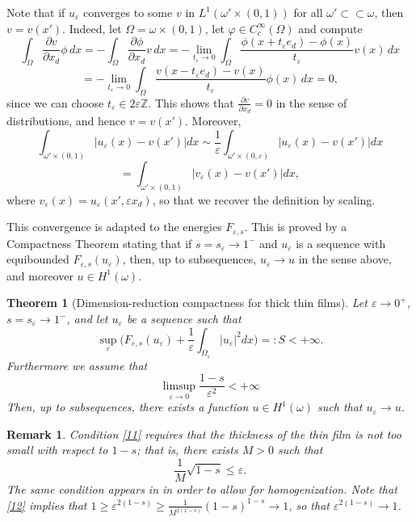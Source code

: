 \documentclass{article}
\newtheorem{remark}[lemma]{Remark}
\newtheorem{theorem}[lemma]{Theorem}
\newcommand{\e}{\varepsilon}
\begin{document}
Note that if $u_\e$ converges to some $v$ in $L^1(\omega'\times (0,1))$  for all $\omega'\subset\!\subset\omega$, then $v=v(x')$. Indeed, let $\Omega=\omega\times (0,1)$, let $\varphi\in C^\infty_c(\Omega)$ and compute 
$$
\int_\Omega \frac{\partial v}{\partial x_d}\phi \,dx= -\int_\Omega \frac{\partial \phi}{\partial x_d}v \,dx=
-\lim_{t_\e\to 0}\int_\Omega \frac{\phi(x+t_\e e_d)-\phi(x)}{t_\e}v(x) \,dx
$$
$$=
-\lim_{t_\e\to 0}\int_\Omega \frac{v(x-t_\e e_d)-v(x)}{t_\e}\phi(x) \,dx=0,
$$
since we can choose $t_\e\in2\e\mathbb Z$. This shows that $\frac{\partial v}{\partial x_d}=0$ in the sense of distributions, and hence $v=v(x')$. Moreover,
$$
\int_{\omega'\times (0,1)} |u_\e(x)-v(x')|dx\sim \frac1{\e}\int_{\omega'\times (0,\e)} |u_\e(x)-v(x')|dx
$$
$$
= \int_{\omega'\times (0,1)} |v_\e(x)-v(x')|dx,
$$
where $v_\e(x)= u_\e(x',\e x_d)$, so that we recover the definition by scaling.

\smallskip
This convergence is adapted to the energies $F_{\e,s}$. This is proved by a Compactness Theorem stating that if $s=s_\e\to 1^-$ and $u_\e$ is a sequence with equibounded $F_{\e,s}(u_\e)$, then, up to subsequences, $u_\e\to u$ in the sense above, and moreover $u\in H^1(\omega)$. 

\begin{theorem}[Dimension-reduction compactness for thick thin films] Let $\e\to 0^+$, $s=s_\e\to 1^-$, and let $u_\e$ be a sequence such that 
\begin{equation}\label{limitaz}\sup_\e \Big(F_{\e,s}(u_\e)+ \frac1\e\int_{\Omega_\e}|u_\e|^2dx\Big)=:S<+\infty.\end{equation} 
Furthermore we assume that
\begin{equation}\label{11}
\limsup_{\e\to 0} \frac{1-s}{\e^2}<+\infty
\end{equation}
Then, up to subsequences, there exists a function $u\in H^1(\omega)$ such that $u_\e\to u$. \end{theorem}

\begin{remark}\label{re1}\rm Condition \eqref{11} requires that the thickness of the thin film is not too small with respect to $1-s$; that is, there exists $M>0$ such that
\begin{equation}\label{12}
\frac1M\sqrt{1-s}\le \e.
\end{equation}
The same condition appears in \cite{BBD} in order to allow for homogenization.
Note that \eqref{12} implies that  $1\ge \e^{2(1-s)}\ge \frac1{M^{2(1-s)}}(1-s)^{1-s}\to 1$, so that  $\e^{2(1-s)}\to 1$.
\end{remark}
\end{document}
